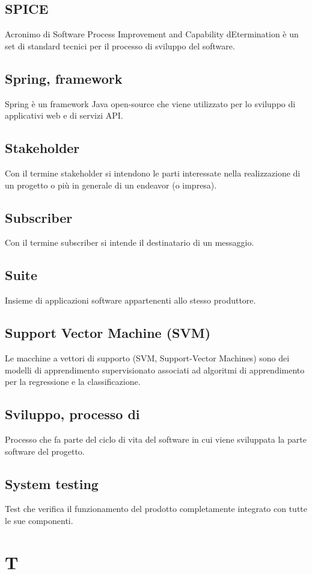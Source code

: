 \subsection{SPICE} Acronimo di Software Process Improvement and Capability dEtermination è un set di standard tecnici per il processo di sviluppo del software.
\subsection{Spring, framework} Spring è un framework Java open-source che viene utilizzato per lo sviluppo di applicativi web e di servizi API.
\subsection{Stakeholder}  Con il termine stakeholder si intendono le parti interessate nella realizzazione di un progetto o più in generale di un endeavor (o impresa).
\subsection{Subscriber} Con il termine subscriber si intende il destinatario di un messaggio.
\subsection{Suite} Insieme di applicazioni software appartenenti allo stesso produttore.
\subsection{Support Vector Machine (SVM)} Le macchine a vettori di supporto (SVM, Support-Vector Machines) sono dei modelli di apprendimento supervisionato associati ad algoritmi di apprendimento per la regressione e la classificazione.
\subsection{Sviluppo, processo di} Processo che fa parte del ciclo di vita del software in cui viene sviluppata la parte software del progetto.
\subsection{System testing} Test che verifica il funzionamento del prodotto completamente integrato con tutte le sue componenti.

\newpage \section{T}

